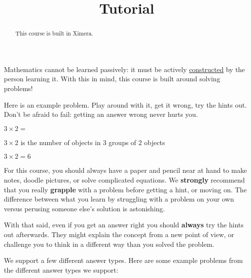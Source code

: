 \documentclass{ximera}
\title{Tutorial}
\begin{document}
\begin{abstract}
  This course is built in Ximera.
\end{abstract}\maketitle

Mathematics cannot be learned passively: it must be actively
\href{http://en.wikipedia.org/wiki/Constructivism_(philosophy_of_education)}{constructed}
by the person learning it.  With this in mind, this course
is built around solving problems!

Here is an example problem.  Play around with it, get it wrong, try
the hints out.  Don't be afraid to fail: getting an answer wrong never
hurts you.

\begin{problem}
    $3\times 2 = $ 
   
    \begin{hint}
      $3 \times 2$ is the number of objects in $3$ groups of $2$ objects
    \end{hint}
    \begin{hint}
    \end{hint}
    \begin{hint}
      $3\times 2=6$
    \end{hint}
\end{problem}

For this course, you should always have a paper and pencil near at
hand to make notes, doodle pictures, or solve complicated equations.
We \textbf{strongly} recommend that you really \textbf{grapple} with a
problem before getting a hint, or moving on.  The difference between
what you learn by struggling with a problem on your own versus
perusing someone else's solution is astonishing.

With that said, even if you get an answer right you should \textbf{always} try the
hints out afterwards.  They might explain the concept from a new point
of view, or challenge you to think in a different way than you solved
the problem.


We support a few different answer types. Here are some example
problems from the different answer types we support:
\end{document}
